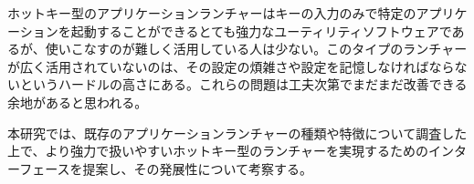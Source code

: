 \begin{jabstract}

ホットキー型のアプリケーションランチャーはキーの入力のみで特定のアプリケーションを起動することができるとても強力なユーティリティソフトウェアであるが、使いこなすのが難しく活用している人は少ない。このタイプのランチャーが広く活用されていないのは、その設定の煩雑さや設定を記憶しなければならないというハードルの高さにある。これらの問題は工夫次第でまだまだ改善できる余地があると思われる。

本研究では、既存のアプリケーションランチャーの種類や特徴について調査した上で、より強力で扱いやすいホットキー型のランチャーを実現するためのインターフェースを提案し、その発展性について考察する。

\end{jabstract}
